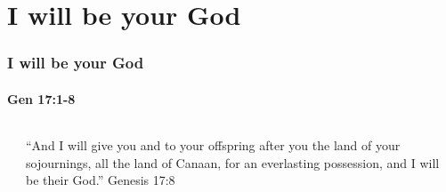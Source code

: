 \section{I will be your God}

\begin{frame}
\frametitle{I will be your God}
\framesubtitle{Gen 17:1-8}
\begin{columns}[T]
	\begin{column}{0.5\textwidth}
	\end{column}
	\begin{column}{0.5\textwidth}
		``And I will give you and to your offspring after you the land of your sojournings, all the land of Canaan, for an everlasting possession, and \alert{I will be  their God}.'' Genesis 17:8\\~\\
	\end{column}
\end{columns}
\end{frame}

